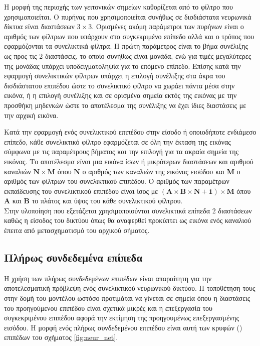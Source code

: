 Η μορφή της περιοχής των γειτονικών σημείων καθορίζεται από το φίλτρο  που χρησιμοποιείται. Ο πυρήνας που χρησιμοποιείται συνήθως σε δισδιάστατα νευρωνικά δίκτυα είναι διαστάσεων $3\times3$. Ορισμένες ακόμη παράμετροι των πυρήνων είναι ο αριθμός των φίλτρων που υπάρχουν στο συγκεκριμένο επίπεδο αλλά και ο τρόπος που εφαρμόζονται τα συνελικτικά φίλτρα. Η πρώτη παράμετρος είναι το βήμα συνέλιξης ως προς τις 2 διαστάσεις, το οποίο συνήθως είναι μονάδα, ενώ για τιμές μεγαλύτερες της μονάδας υπάρχει υποδειγματοληψία για το επόμενο επίπεδο. Επίσης κατά την εφαρμογή συνελικτικών φίλτρων υπάρχει η επιλογή συνέλιξης στα άκρα του δισδιάστατου επιπέδου ώστε το συνελικτικό φίλτρο να χωράει πάντα μέσα στην εικόνα, ή η επιλογή συνέλιξης και σε ορισμένα σημεία εκτός της εικόνας με την προσθήκη μηδενκών ώστε το αποτέλεσμα της συνέλιξης να έχει ίδιες διαστάσεις με την αρχική εικόνα.

Κατά την εφαρμογή ενός συνελικτικού επιπέδου στην είσοδο ή οποιοδήποτε ενδιάμεσο επίπεδο, κάθε συνελικτικό φίλτρο εφαρμόζεται σε όλη την έκταση της εικόνας σύμφωνα με τις παραμέτρους βήματος και την επιλογή για τα ακραία σημεία της εικόνας. Το αποτέλεσμα είναι μια εικόνα ίσων ή μικρότερων διαστάσεων και αριθμού καναλιών $\mathbf{N\times M}$ όπου $\mathbf{N}$ ο αριθμός των καναλιών της εικόνας εισόδου και $\mathbf{M}$ ο αριθμός των φίλτρων του συνελικτικού επιπέδου. Ο αριθμός των παραμέτρων εκπαίδευσης του συνελικτικού επιπέδου είναι ίσος με $\mathbf{\left(A \times B\times N+1\right)\times M}$ όπου $\mathbf{A}$ και $\mathbf{B}$ το πλάτος και ύψος του κάθε συνελικτικού φίλτρου.\\

Στην υλοποίηση που εξετάζεται χρησιμοποιούνται συνελικτικά επίπεδα 2 διαστάσεων καθώς η είσοδος του δικτύου όπως θα αναφερθεί προκύπτει ως εικόνα ενός καναλιού έπειτα από μετασχηματισμό του αρχικού σήματος.

\subsection{Πλήρως συνδεδεμένα επίπεδα}
Η χρήση των πλήρως συνδεδεμένων επιπέδων είναι απαραίτητη για την αποτελεσματική πρόβλεψη ενός συνελικτικού νευρωνικού δικτύου. Η τοποθέτηση τους στην δομή του μοντέλου ωστόσο προτιμάται να γίνεται σε σημεία όπου η διαστάσεις του προηγούμενου επιπέδου είναι σχετικά μικρές και η επεξεργασία του συγκεκριμένου επιπέδου αφορά την εκτίμηση της προηγουμένως επεξεργασμένης εισόδου. Η μορφή ενός πλήρως συνδεδεμένου επιπέδου είναι αυτή των κρυφών (\textbf{}) επιπέδων του σχήματος \ref{fig:neur_net}.

